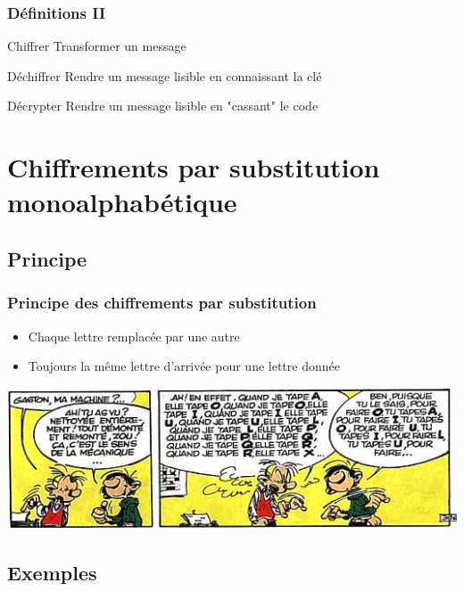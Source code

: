 \documentclass[xcolor={dvipsnames}]{beamer}
\begin{document}
\begin{frame}
\frametitle{Définitions II}	

	\begin{block}{Chiffrer}
		Transformer un message
	\end{block}\pause
	
	\begin{block}{Déchiffrer}
		Rendre un message lisible en connaissant la clé
	\end{block}
	
	
	\begin{block}{Décrypter}
		Rendre un message lisible en "cassant" le code
	\end{block}

\end{frame}
\section{Chiffrements par substitution monoalphabétique}

\subsection{Principe}

\begin{frame}
\frametitle{Principe des chiffrements par substitution}

\begin{itemize}
	\item Chaque lettre remplacée par une autre
	\item Toujours la même lettre d'arrivée pour une lettre donnée
\end{itemize}

\begin{center}
	\includegraphics[scale=0.6]{gaston}
\end{center}
\end{frame}


\subsection{Exemples}
\end{document}

